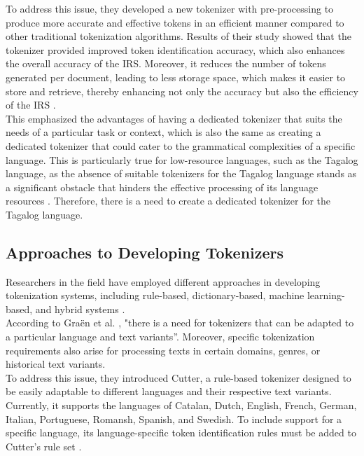 \documentclass[journal]{./IEEE/IEEEtran}
\begin{document}
To address this issue, they developed a new tokenizer with pre-processing to produce more accurate and effective tokens in an efficient manner compared to other traditional tokenization algorithms. Results of their study showed that the tokenizer provided improved token identification accuracy, which also enhances the overall accuracy of the IRS. Moreover, it reduces the number of tokens generated per document, leading to less storage space, which makes it easier to store and retrieve, thereby enhancing not only the accuracy but also the efficiency of the IRS {\cite{TokenizationForIRS}}. \\

This emphasized the advantages of having a dedicated tokenizer that suits the needs of a particular task or context, which is also the same as creating a dedicated tokenizer that could cater to the grammatical complexities of a specific language. This is particularly true for low-resource languages, such as the Tagalog language, as the absence of suitable tokenizers for the Tagalog language stands as a significant obstacle that hinders the effective processing of its language resources {\cite{TweetTaglish}}. Therefore, there is a need to create a dedicated tokenizer for the Tagalog language.

\subsection {Approaches to Developing Tokenizers}

Researchers in the field have employed different approaches in developing tokenization systems, including rule-based, dictionary-based, machine learning-based, and hybrid systems {\cite{ChemTok}}. \\

According to Graën et al. {\cite{Cutter}}, "there is a need for tokenizers that can be adapted to a particular language and text variants”. Moreover, specific tokenization requirements also arise for processing texts in certain domains, genres, or historical text variants. \\

To address this issue, they introduced Cutter, a rule-based tokenizer designed to be easily adaptable to different languages and their respective text variants. Currently, it supports the languages of Catalan, Dutch, English, French, German, Italian, Portuguese, Romansh, Spanish, and Swedish. To include support for a specific language, its language-specific token identification rules must be added to Cutter's rule set {\cite{Cutter}}. \\
\end{document}
